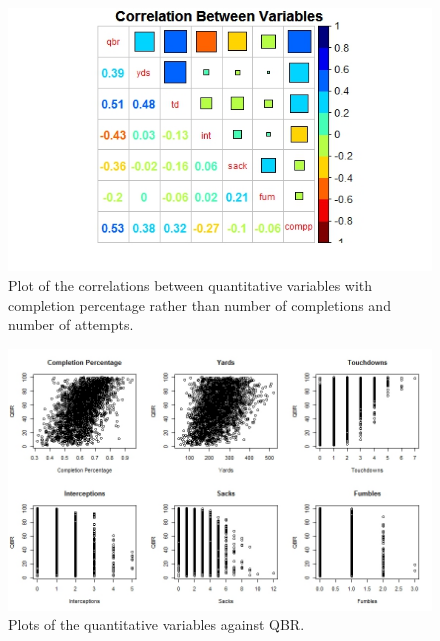 \documentclass[12pt]{article}\usepackage[]{graphicx}\usepackage[]{color}
\begin{document}
\begin{figure}[h]
\centering
\includegraphics[width=1.2\textwidth]{correlation2.jpeg}
\captionsetup{font=footnotesize,labelfont=footnotesize}
\caption{\label{fig:corr2} Plot of the correlations between quantitative variables with completion percentage rather than number of completions and number of attempts.}
\end{figure}

\begin{figure}[h]
	\centering
	\includegraphics[width=.9\textwidth]{allthescatters.jpeg}
	\captionsetup{font=footnotesize,labelfont=footnotesize}
	\caption{\label{fig:allthescatters} Plots of the quantitative variables against QBR.}
\end{figure}
\end{document}
